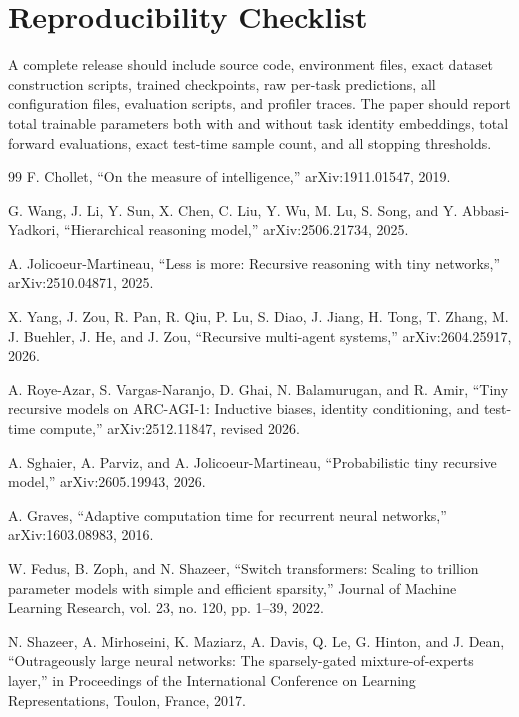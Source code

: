 \documentclass[10pt,a4paper,twocolumn]{article}
\begin{document}
\section{Reproducibility Checklist}
A complete release should include source code, environment files, exact dataset construction scripts, trained checkpoints, raw per-task predictions, all configuration files, evaluation scripts, and profiler traces. The paper should report total trainable parameters both with and without task identity embeddings, total forward evaluations, exact test-time sample count, and all stopping thresholds.

\balance
\begin{thebibliography}{99}
F. Chollet, ``On the measure of intelligence,'' arXiv:1911.01547, 2019.

G. Wang, J. Li, Y. Sun, X. Chen, C. Liu, Y. Wu, M. Lu, S. Song, and Y. Abbasi-Yadkori, ``Hierarchical reasoning model,'' arXiv:2506.21734, 2025.

A. Jolicoeur-Martineau, ``Less is more: Recursive reasoning with tiny networks,'' arXiv:2510.04871, 2025.

X. Yang, J. Zou, R. Pan, R. Qiu, P. Lu, S. Diao, J. Jiang, H. Tong, T. Zhang, M. J. Buehler, J. He, and J. Zou, ``Recursive multi-agent systems,'' arXiv:2604.25917, 2026.

A. Roye-Azar, S. Vargas-Naranjo, D. Ghai, N. Balamurugan, and R. Amir, ``Tiny recursive models on ARC-AGI-1: Inductive biases, identity conditioning, and test-time compute,'' arXiv:2512.11847, revised 2026.

A. Sghaier, A. Parviz, and A. Jolicoeur-Martineau, ``Probabilistic tiny recursive model,'' arXiv:2605.19943, 2026.

A. Graves, ``Adaptive computation time for recurrent neural networks,'' arXiv:1603.08983, 2016.

W. Fedus, B. Zoph, and N. Shazeer, ``Switch transformers: Scaling to trillion parameter models with simple and efficient sparsity,'' Journal of Machine Learning Research, vol. 23, no. 120, pp. 1--39, 2022.

N. Shazeer, A. Mirhoseini, K. Maziarz, A. Davis, Q. Le, G. Hinton, and J. Dean, ``Outrageously large neural networks: The sparsely-gated mixture-of-experts layer,'' in Proceedings of the International Conference on Learning Representations, Toulon, France, 2017.


\end{thebibliography}
\end{document}
